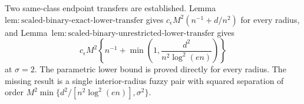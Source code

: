 Two same-class endpoint transfers are established.  Lemma~\(\mathrm{lem:scaled\text{-}binary\text{-}exact\text{-}lower\text{-}transfer}\) gives \(c_{\epsilon}M^2(n^{-1}+d/n^2)\) for every radius, and Lemma~\(\mathrm{lem:scaled\text{-}binary\text{-}unrestricted\text{-}lower\text{-}transfer}\) gives
\[
 c_{\epsilon}M^2\left\{n^{-1}+\min\left(1,\frac{d^2}{n^2\log^2(en)}\right)\right\}
\]
at \(\sigma=2\).  The parametric lower bound is proved directly for every radius.  The missing result is a single interior-radius fuzzy pair with squared separation of order \(M^2\min\{d^2/[n^2\log^2(en)],\sigma^2\}\).